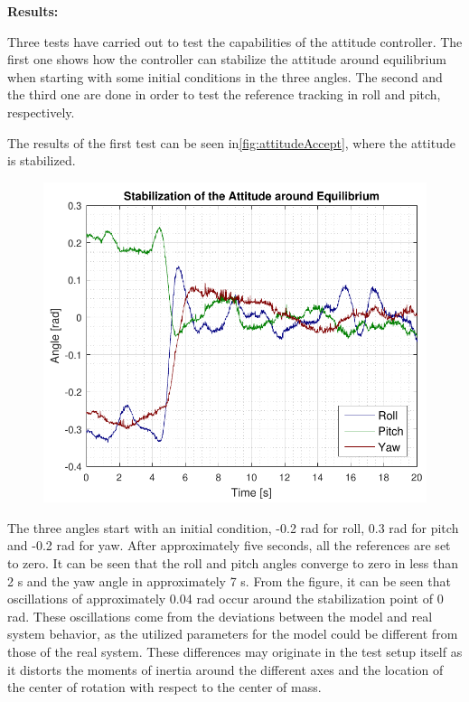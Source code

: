\textbf{Results:}

Three tests have carried out to test the capabilities of the attitude controller. The first one shows how the controller can stabilize the attitude around equilibrium when starting with some initial conditions in the three angles. The second and the third one are done in order to test the reference tracking in roll and pitch, respectively.

The results of the first test can be seen in\autoref{fig:attitudeAccept}, where the attitude is stabilized.
\begin{figure}[H]
	\includegraphics[scale=.7]{figures/attitudeAccept.pdf}
	\centering			
	\label{fig:attitudeAccept}
\end{figure} 
%
The three angles start with an initial condition, -0.2 rad for roll, 0.3 rad for pitch and -0.2 rad for yaw. After approximately five seconds, all the references are set to zero. It can be seen that the roll and pitch angles converge to zero in less than 2 s and the yaw angle in approximately 7 s. From the figure, it can be seen that oscillations of approximately 0.04 rad occur around the stabilization point of 0 rad. These oscillations come from the deviations between the model and real system behavior, as the utilized parameters for the model could be different from those of the real system. These differences may originate in the test setup itself as it distorts the moments of inertia around the different axes and the location of the center of rotation with respect to the center of mass. %

